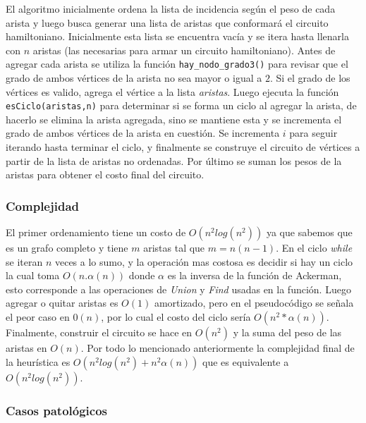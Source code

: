 \documentclass[10pt,a4paper]{article}
\begin{document}
El algoritmo inicialmente ordena la lista de incidencia según el peso de cada arista y luego busca generar una lista de aristas que conformará el circuito hamiltoniano. Inicialmente esta lista se encuentra vacía y se itera hasta llenarla con $n$ aristas (las necesarias para armar un circuito hamiltoniano). Antes de agregar cada arista se utiliza la función \texttt{hay\_nodo\_grado3()} para revisar que el grado de ambos vértices de la arista no sea mayor o igual a $2$. Si el grado de los vértices es valido, agrega el vértice a la lista \emph{aristas}. Luego ejecuta la función \texttt{esCiclo(aristas,n)} para determinar si se forma un ciclo al agregar la arista, de hacerlo se elimina la arista agregada, sino se mantiene esta y se incrementa el grado de ambos vértices de la arista en cuestión. Se incrementa $i$ para seguir iterando hasta terminar el ciclo, y finalmente se construye el circuito de vértices a partir de la lista de aristas no ordenadas. Por último se suman los pesos de la aristas para obtener el costo final del circuito. 

\subsubsection{Complejidad}

El primer ordenamiento tiene un costo de $O(n^2log(n^2))$ ya que sabemos que es un grafo completo y tiene $m$ aristas tal que $m=n(n-1)$. En el ciclo \emph{while} se iteran $n$ veces a lo sumo, y la operación mas costosa es decidir si hay un ciclo la cual toma $O(n.\alpha(n))$ donde $\alpha$ es la inversa de la función de Ackerman, esto corresponde a las operaciones de \emph{Union} y \emph{Find} usadas en la función. Luego agregar o quitar aristas es $O(1)$ amortizado, pero en el pseudocódigo se señala el peor caso en $0(n)$, por lo cual el costo del ciclo sería $O(n^2*\alpha(n))$. Finalmente, construir el circuito se hace en $O(n^2)$ y la suma del peso de las aristas en $O(n)$. Por todo lo mencionado anteriormente la complejidad final de la heurística es  $O(n^2log(n^2) + n^2\alpha(n))$ que es equivalente a $O(n^2log(n^2))$.

\subsubsection{Casos patológicos}
\end{document}
